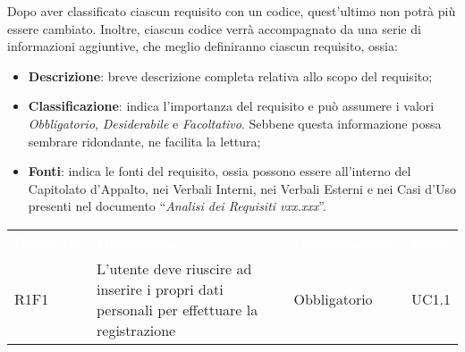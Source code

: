 \documentclass[a4paper]{article}
\begin{document}
Dopo aver classificato ciascun requisito con un codice, quest’ultimo non potrà più essere cambiato.
Inoltre, ciascun codice verrà accompagnato da una serie di informazioni aggiuntive, che meglio definiranno ciascun requisito, ossia:

\begin{itemize}
	\item \textbf{Descrizione}: breve descrizione completa relativa allo scopo del requisito;
	\item \textbf{Classificazione}: indica l’importanza del requisito e può assumere i valori \textit{Obbligatorio}, \textit{Desiderabile} e \textit{Facoltativo}. Sebbene questa informazione possa sembrare ridondante, ne facilita la lettura;
	\item \textbf{Fonti}: indica le fonti del requisito, ossia possono essere all'interno del Capitolato d’Appalto, nei Verbali Interni, nei Verbali Esterni e nei Casi d’Uso presenti nel documento “\textit{Analisi dei Requisiti vxx.xxx}”.
\end{itemize}


\begin{table}[!htbp]
\renewcommand{\arraystretch}{1.5}
\begin{tabular}{ m{}<{\centering}  m{}<{\centering}  m{}<{\centering}  m{}<{\centering}}
	\rowcolor{darkblue}
	\textcolor{white}{\textbf{Requisito}} &\textcolor{white}{\textbf{Descrizione}}& \textcolor{white}{\textbf{Classificazione}} & \textcolor{white}{\textbf{Fonti}}\\ 

	\rowcolor{gray!10} R1F1 & L’utente deve riuscire ad inserire i propri dati personali per effettuare la registrazione & Obbligatorio & UC1.1 \\	

\end{tabular}
\end{table}

\end{document}
